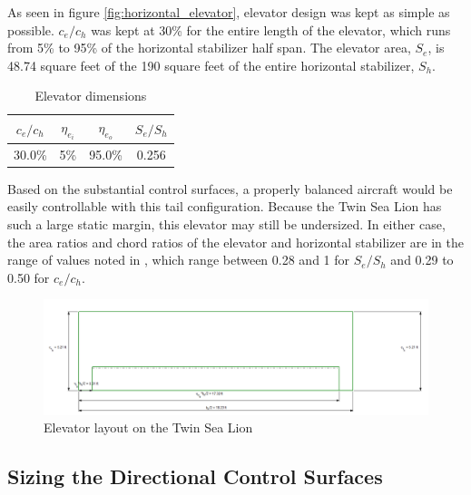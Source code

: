 \documentclass[conf]{new-aiaa}
\begin{document}
As seen in figure \ref{fig:horizontal_elevator}, elevator design was kept as simple as possible. $c_e/c_h$ was kept at 30\% for the entire length of the elevator, which runs from 5\% to 95\% of the horizontal stabilizer half span. The elevator area, $S_e$, is 48.74 square feet of the 190 square feet of the entire horizontal stabilizer, $S_h$.

\begin{table}[H]
\centering
\caption{Elevator dimensions}
\begin{tabular}{|c|c|c|c|}\hline
    $c_e/c_h$ & $\eta_{e_i}$ & $\eta_{e_o}$ & $S_e/S_h$ \\ \hline
    30.0\%    & 5\%          & 95.0\%       & 0.256     \\ \hline
\end{tabular}
\label{tab:elevator_size_table}
\end{table}

Based on the substantial control surfaces, a properly balanced aircraft would 
be easily controllable with this tail configuration. Because the Twin Sea Lion has 
such a large static margin, this elevator may still be undersized. In either case, 
the area ratios and chord ratios of the elevator and horizontal stabilizer are in 
the range of values noted in \cite{orange_book}, which range between 0.28 and 1 for $S_e/S_h$ and 0.29 to 0.50 for $c_e/c_h$.

\begin{figure}[H]
    \includegraphics[width=\textwidth]{Report3Printouts/Empannage/Horizontal_elevator_plot.png}
    \caption{Elevator layout on the Twin Sea Lion}
    \label{fig:horizontal_elevator_plot}
\end{figure}

\subsection{Sizing the Directional Control Surfaces}
\end{document}

